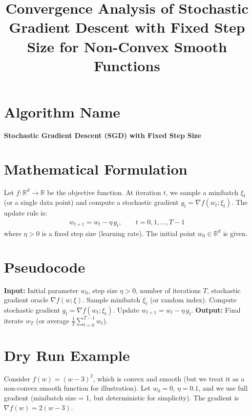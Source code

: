 \documentclass{article}
\title{Convergence Analysis of Stochastic Gradient Descent with Fixed Step Size for Non-Convex Smooth Functions}
\author{}
\date{}
\begin{document}
\maketitle

\section*{Algorithm Name}
\textbf{Stochastic Gradient Descent (SGD) with Fixed Step Size}

\section*{Mathematical Formulation}
Let $f: \mathbb{R}^d \to \mathbb{R}$ be the objective function. At iteration $t$, we sample a minibatch $\xi_t$ (or a single data point) and compute a stochastic gradient $g_t = \nabla f(w_t; \xi_t)$. The update rule is:
\begin{align}
    w_{t+1} = w_t - \eta \, g_t, \qquad t = 0, 1, \dots, T-1
\end{align}
where $\eta > 0$ is a fixed step size (learning rate). The initial point $w_0 \in \mathbb{R}^d$ is given.

\section*{Pseudocode}
\begin{algorithm}[H]
\caption{SGD with Fixed Step Size}
\begin{algorithmic}
\STATE \textbf{Input:} Initial parameter $w_0$, step size $\eta > 0$, number of iterations $T$, stochastic gradient oracle $\nabla f(w; \xi)$.
    \STATE Sample minibatch $\xi_t$ (or random index).
    \STATE Compute stochastic gradient $g_t = \nabla f(w_t; \xi_t)$.
    \STATE Update $w_{t+1} = w_t - \eta \, g_t$.
\ENDFOR
\STATE \textbf{Output:} Final iterate $w_T$ (or average $\frac{1}{T}\sum_{t=0}^{T-1} w_t$).
\end{algorithmic}
\end{algorithm}

\section*{Dry Run Example}
Consider $f(w) = (w-3)^2$, which is convex and smooth (but we treat it as a non-convex smooth function for illustration). Let $w_0 = 0$, $\eta = 0.1$, and we use full gradient (minibatch size = 1, but deterministic for simplicity). The gradient is $\nabla f(w) = 2(w-3)$.
\end{document}
